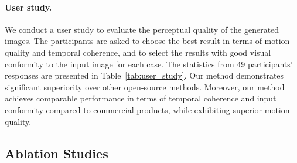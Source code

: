  
\begin{table}[t]
  \caption{User study statistics of the preference rate for Motion Quality (M.Q.) \& Temporal Coherence (T.C.), and selection rate for visual conformity to the input image (I.C.=Input Conformity).}
  \vspace{-0.8em}
  \label{tab:user_study}
\vspace{-4mm}
\end{table}
\vspace{-4mm}
\paragraph{User study.}
We conduct a user study to evaluate the perceptual quality of the generated images. 
The participants are asked to choose the best result in terms of motion quality and temporal coherence, and to select the results with good visual conformity to the input image for each case. The statistics from 49 participants' responses are presented in Table~\ref{tab:user_study}. Our method demonstrates significant superiority over other open-source methods. Moreover, our method achieves comparable performance in terms of temporal coherence and input conformity compared to commercial products, while exhibiting superior motion quality.



\subsection{Ablation Studies}
\label{subsec:ablation}
